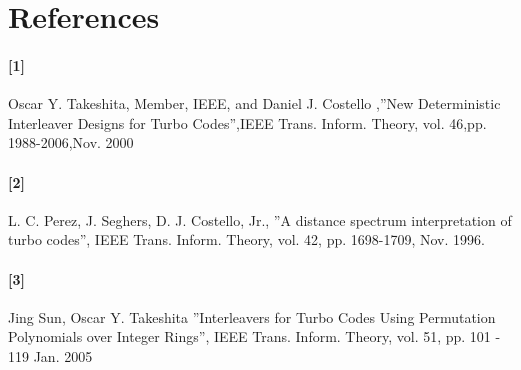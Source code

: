 \documentclass[20 pts]{article}
\begin{document}
\newpage
\section{References}
\paragraph{[1]}  Oscar Y. Takeshita, Member, IEEE, and Daniel J. Costello ,''New Deterministic Interleaver Designs for Turbo Codes'',IEEE Trans. Inform. Theory, vol.  46,pp. 1988-2006,Nov. 2000\\
\paragraph{[2]}  L. C. Perez, J. Seghers, D. J. Costello, Jr., ''A distance spectrum interpretation of turbo codes'', IEEE Trans. Inform. Theory, vol. 42, pp. 1698-1709, Nov. 1996.\\
\paragraph{[3]} Jing Sun, Oscar Y. Takeshita ”Interleavers for Turbo Codes Using Permutation Polynomials over Integer Rings”, IEEE Trans. Inform. Theory, vol. 51,
pp. 101 - 119 Jan. 2005
\end{document}
